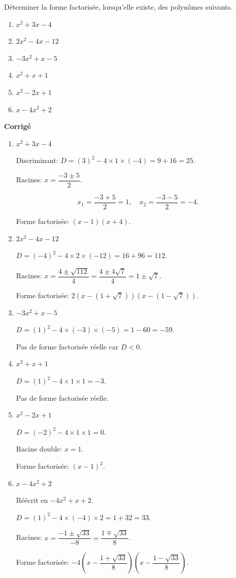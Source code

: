\documentclass{article}
\begin{document}
Déterminer la forme factorisée, lorsqu'elle existe, des polynômes suivants.
\begin{enumerate}
    \item $x^2 + 3x - 4$
    \item $2x^2 - 4x - 12$
    \item $-3x^2 + x - 5$
    \item $x^2 + x + 1$
    \item $x^2 - 2x + 1$
    \item $x - 4x^2 + 2$
\end{enumerate}

\textbf{Corrigé}

\begin{enumerate}
    \item $x^2 + 3x - 4$

    Discriminant: $D = (3)^2 - 4 \times 1 \times (-4) = 9 + 16 = 25$.

    Racines: $x = \dfrac{-3 \pm 5}{2}$.

    \[
    x_1 = \dfrac{-3 + 5}{2} = 1,\quad x_2 = \dfrac{-3 - 5}{2} = -4.
    \]

    Forme factorisée: $(x - 1)(x + 4)$.

    \item $2x^2 - 4x - 12$

    $D = (-4)^2 - 4 \times 2 \times (-12) = 16 + 96 = 112$.

    Racines: $x = \dfrac{4 \pm \sqrt{112}}{4} = \dfrac{4 \pm 4\sqrt{7}}{4} = 1 \pm \sqrt{7}$.

    Forme factorisée: $2\left(x - (1 + \sqrt{7})\right)\left(x - (1 - \sqrt{7})\right)$.

    \item $-3x^2 + x - 5$

    $D = (1)^2 - 4 \times (-3) \times (-5) = 1 - 60 = -59$.

    Pas de forme factorisée réelle car $D < 0$.

    \item $x^2 + x + 1$

    $D = (1)^2 - 4 \times 1 \times 1 = -3$.

    Pas de forme factorisée réelle.

    \item $x^2 - 2x + 1$

    $D = (-2)^2 - 4 \times 1 \times 1 = 0$.

    Racine double: $x = 1$.

    Forme factorisée: $(x - 1)^2$.

    \item $x - 4x^2 + 2$

    Réécrit en $-4x^2 + x + 2$.

    $D = (1)^2 - 4 \times (-4) \times 2 = 1 + 32 = 33$.

    Racines: $x = \dfrac{-1 \pm \sqrt{33}}{-8} = \dfrac{1 \mp \sqrt{33}}{8}$.

    Forme factorisée: $-4\left(x - \dfrac{1 + \sqrt{33}}{8}\right)\left(x - \dfrac{1 - \sqrt{33}}{8}\right)$.
\end{enumerate}
\end{document}
